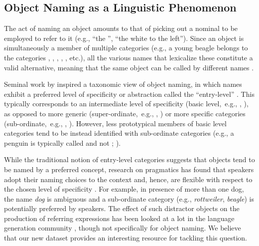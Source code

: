 \subsection{Object Naming as a Linguistic Phenomenon}
\label{subsec:rosch}

The act of naming an object amounts to that of picking out a nominal to be employed to refer to it (e.g., ``the '', ``the white  to the left'').
Since an object is simultaneously a member of multiple categories (e.g., a young beagle belongs to the categories , , , , , etc.), all the various names that lexicalize these constitute a valid alternative, meaning that the same object can be called by different names \cite{brown1958shall,murphy2004big}.

Seminal work by  inspired a taxonomic view of object naming, in which names exhibit a preferred level of specificity or abstraction called the ``entry-level'' \cite{jolicoeur1984pictures}. 
This typically corresponds to an intermediate level of specificity (basic level,\ e.g., , ), as opposed to more generic (super-ordinate,\ e.g., , ) or more specific categories (sub-ordinate,\ e.g., , ).
However, less prototypical members of basic level categories tend to be instead identified with sub-ordinate categories (e.g., a penguin is typically called  and not ; ). 

While the traditional notion of entry-level categories suggests that objects tend to be named by a  preferred concept, research on pragmatics has found that speakers adopt their naming choices to the context and, hence, are flexible with respect to the chosen level of specificity \cite{olson1970language,rohde2012communicating,graf2016animal}.
For example, in presence of more than one dog, the name \textsl{dog} is ambiguous and a sub-ordinate category (e.g., \textsl{rottweiler}, \textsl{beagle}) is potentially preferred by speakers. The effect of such distractor objects on the production of referring expressions has been looked at a lot in the language generation community \cite{krahmer:2012}, though not specifically for object naming. We believe that our new dataset provides an interesting resource for tackling this question.


